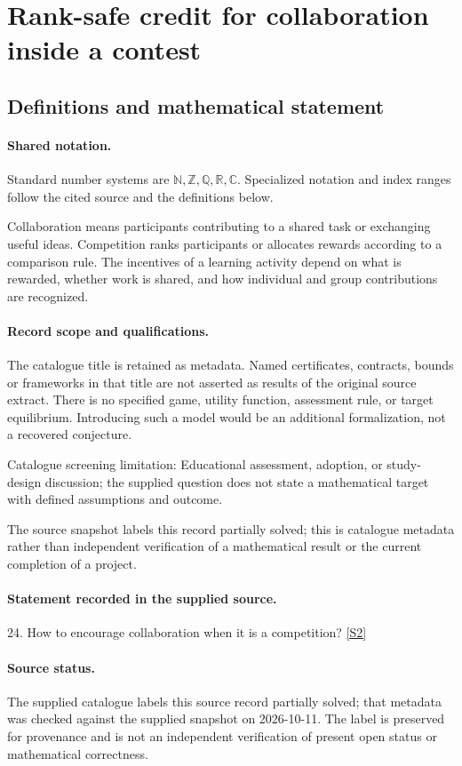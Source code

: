 \documentclass[11pt]{article}
\newcommand{\sref}[2]{\hyperlink{source:#1:#2}{[S#2]}}
\begin{document}
\section{Rank-safe credit for collaboration inside a contest}\label{statement}

\subsection{Definitions and mathematical statement}

\paragraph{Shared notation.}Standard number systems are $\mathbb N,\mathbb Z,\mathbb Q,\mathbb R,\mathbb C$. Specialized notation and index ranges follow the cited source and the definitions below.


Collaboration means participants contributing to a shared task or exchanging useful ideas. Competition ranks participants or allocates rewards according to a comparison rule. The incentives of a learning activity depend on what is rewarded, whether work is shared, and how individual and group contributions are recognized.
\paragraph{Record scope and qualifications.}
The catalogue title is retained as metadata. Named certificates, contracts, bounds or frameworks in that title are not asserted as results of the original source extract.
There is no specified game, utility function, assessment rule, or target equilibrium. Introducing such a model would be an additional formalization, not a recovered conjecture.

Catalogue screening limitation: Educational assessment, adoption, or study-design discussion; the supplied question does not state a mathematical target with defined assumptions and outcome.

The source snapshot labels this record partially solved; this is catalogue metadata rather than independent verification of a mathematical result or the current completion of a project.
\paragraph{Statement recorded in the supplied source.}
24. How to encourage collaboration when it is a competition? \sref{statement}{2}
\paragraph{Source status.}
The supplied catalogue labels this source record partially solved; that metadata was checked against the supplied snapshot on 2026-10-11. The label is preserved for provenance and is not an independent verification of present open status or mathematical correctness.
\end{document}
